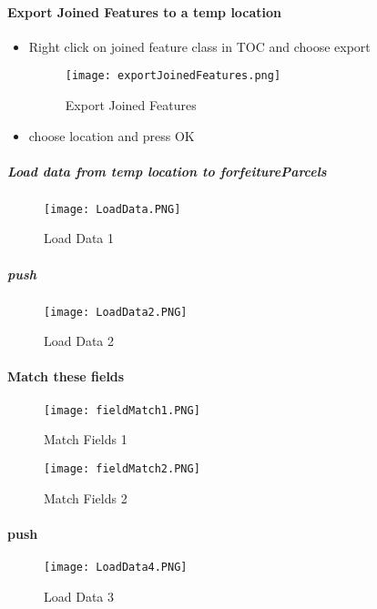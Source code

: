 \paragraph[Export Joined Features]{Export Joined Features to a temp location \texorpdfstring{\\}{}}
\begin{itemize}
\item Right click \rtArrow  on joined feature class in TOC and choose export
\begin{figure}[h!]
\centering
    \texttt{[image: exportJoinedFeatures.png]}
\caption{Export Joined Features}
\end{figure}
\item choose location and press OK
\end{itemize}
\clearpage
\subparagraph[Load data to forfeitureParcels]{\Large Load data from temp location to forfeitureParcels}
\subparagraph*{}
\begin{figure}[h!]
\centering
    \texttt{[image: LoadData.PNG]}
\caption{Load Data 1}
\end{figure}
\clearpage
\subparagraph*{\Large push }
\begin{figure}[h!]
\centering
    \texttt{[image: LoadData2.PNG]}
\caption{Load Data 2}
\end{figure}
\clearpage
\paragraph[Match these fields]{\Large Match these fields}

\begin{figure}[h!]
\centering
    \texttt{[image: fieldMatch1.PNG]}
\vspace{-.2in}

\caption{Match Fields 1}
\end{figure}
\begin{figure}[h!]
\centering
    \texttt{[image: fieldMatch2.PNG]}
\vspace{-.2in}

\caption{Match Fields 2}
\end{figure}
\clearpage
\paragraph*{\Large push }
\begin{figure}[h!]
\centering
    \texttt{[image: LoadData4.PNG]}
\caption{Load Data 3}
\end{figure}
